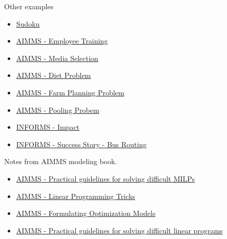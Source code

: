 \begin{resource}
{Other examples}
\begin{itemize}
\item \href{https://www.juliaopt.org/notebooks/JuMP-Sudoku.html}{Sudoku}
\item \href{https://download.aimms.com/aimms/download/manuals/AIMMS3OM_EmployeeTraining.pdf}{AIMMS - Employee Training}

\item \href{https://download.aimms.com/aimms/download/manuals/AIMMS3OM_MediaSelection.pdf}{AIMMS - Media Selection}

\item \href{https://download.aimms.com/aimms/download/manuals/AIMMS3OM_Diet.pdf}{AIMMS - Diet Problem}

\item \href{https://download.aimms.com/aimms/download/manuals/AIMMS3OM_FarmPlanning.pdf}{AIMMS - Farm Planning Problem}

\item \href{https://download.aimms.com/aimms/download/manuals/AIMMS3OM_Pooling.pdf}{AIMMS - Pooling Probem}

\item \href{https://www.informs.org/Impact}{INFORMS - Impact}
\item \href{https://www.informs.org/Impact/O.R.-Analytics-Success-Stories/Optimized-school-bus-routing-helps-school-districts-design-better-policies}{INFORMS - Success Story - Bus Routing}
\end{itemize}

{Notes from AIMMS modeling book.}
\begin{itemize}

\item \href{http://inside.mines.edu/~anewman/MIP_practice120212.pdf}{AIMMS - Practical guidelines for solving difficult MILPs}

\item \href{https://download.aimms.com/aimms/download/manuals/AIMMS3OM_LinearProgrammingTricks.pdf}{AIMMS - Linear Programming Tricks}

\item  \href{https://download.aimms.com/aimms/download/manuals/AIMMS3OM_FormulatingOptimizationModels.pdf}{AIMMS - Formulating Optimization Models}

\item \href{https://pdfs.semanticscholar.org/b01f/ad44c20c372fdda95cbfb980c0d37302de07.pdf}{AIMMS - Practical guidelines for solving difficult linear programs}
\end{itemize}


\end{resource}
